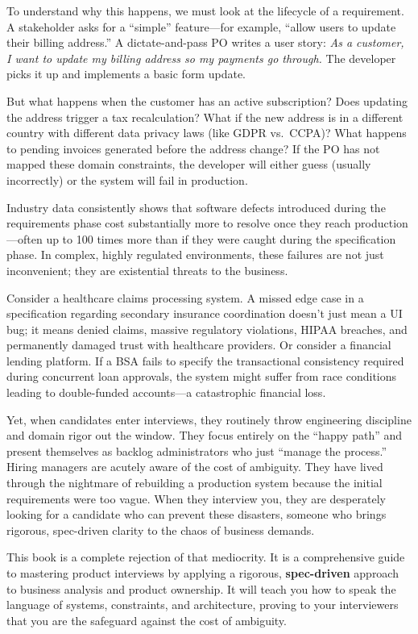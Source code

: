 \documentclass[
  11pt,
  openany,
  oneside]{book}
\begin{document}
To understand why this happens, we must look at the lifecycle of a
requirement. A stakeholder asks for a ``simple'' feature---for example,
``allow users to update their billing address.'' A dictate-and-pass PO
writes a user story: \emph{As a customer, I want to update my billing
address so my payments go through.} The developer picks it up and
implements a basic form update.

But what happens when the customer has an active subscription? Does
updating the address trigger a tax recalculation? What if the new
address is in a different country with different data privacy laws (like
GDPR vs.~CCPA)? What happens to pending invoices generated before the
address change? If the PO has not mapped these domain constraints, the
developer will either guess (usually incorrectly) or the system will
fail in production.

Industry data consistently shows that software defects introduced during
the requirements phase cost substantially more to resolve once they
reach production---often up to 100 times more than if they were caught
during the specification phase. In complex, highly regulated
environments, these failures are not just inconvenient; they are
existential threats to the business.

Consider a healthcare claims processing system. A missed edge case in a
specification regarding secondary insurance coordination doesn't just
mean a UI bug; it means denied claims, massive regulatory violations,
HIPAA breaches, and permanently damaged trust with healthcare providers.
Or consider a financial lending platform. If a BSA fails to specify the
transactional consistency required during concurrent loan approvals, the
system might suffer from race conditions leading to double-funded
accounts---a catastrophic financial loss.

Yet, when candidates enter interviews, they routinely throw engineering
discipline and domain rigor out the window. They focus entirely on the
``happy path'' and present themselves as backlog administrators who just
``manage the process.'' Hiring managers are acutely aware of the cost of
ambiguity. They have lived through the nightmare of rebuilding a
production system because the initial requirements were too vague. When
they interview you, they are desperately looking for a candidate who can
prevent these disasters, someone who brings rigorous, spec-driven
clarity to the chaos of business demands.

This book is a complete rejection of that mediocrity. It is a
comprehensive guide to mastering product interviews by applying a
rigorous, \textbf{spec-driven} approach to business analysis and product
ownership. It will teach you how to speak the language of systems,
constraints, and architecture, proving to your interviewers that you are
the safeguard against the cost of ambiguity.
\end{document}
